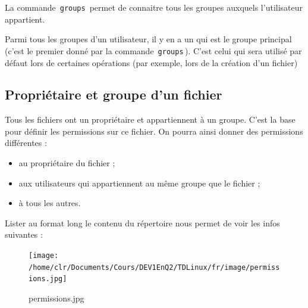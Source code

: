 \documentclass[11pt,a4paper]{article}
\begin{document}
            \par
        
				  La commande \,\verb|groups|\, permet de connaitre tous les groupes 
				  auxquels l'utilisateur appartient.
				
            \par
        
				  Parmi tous les groupes d'un utilisateur, il y en a un qui est le groupe principal (c'est le premier donn\'e par la commande \,\verb|groups|\,). 
				  C'est celui qui sera utilis\'e par d\'efaut lors de certaines op\'erations (par exemple, lors de la cr\'eation d'un fichier)
				
            \par
        \subsection{Propri\'etaire et groupe d'un fichier}
					Tous les fichiers ont un propri\'etaire et appartiennent \`a un groupe.
					C'est la base pour d\'efinir les permissions sur ce fichier.
					On pourra ainsi donner des permissions diff\'erentes :
					
					\begin{itemize}
				
			\item au propri\'etaire du fichier ;
			\item aux utilisateurs qui appartiennent au m\^eme groupe que le fichier ;
			\item  \`a tous les autres. 
					\end{itemize}
				
            \par
        
				  Lister au format long le contenu du r\'epertoire nous permet de voir les infos suivantes :
				
            \par
        \begin{figure}[hbt]
				    \begin{center}
					\texttt{[image: /home/clr/Documents/Cours/DEV1EnQ2/TDLinux/fr/image/permissions.jpg]}
						\end{center}
                
                    \caption[permissions.jpg]{permissions.jpg}
                \end{figure}
                    
            \par
        
\end{document}

